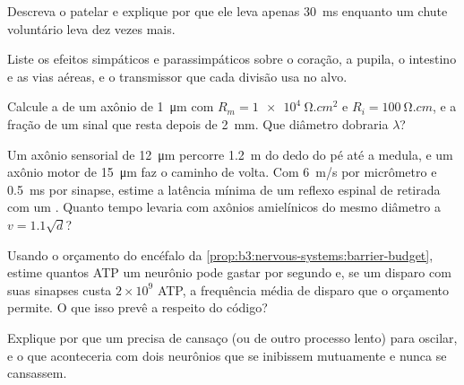 \begin{exercise}[$\star$]\label{exo:b3:nervous-systems:3}
Descreva o  patelar e explique por que ele leva apenas
\qty{30}{ms} enquanto um chute voluntário leva dez vezes mais.
\end{exercise}

\begin{exercise}[$\star$]\label{exo:b3:nervous-systems:4}
Liste os efeitos simpáticos e parassimpáticos sobre o coração, a pupila,
o intestino e as vias aéreas, e o transmissor que cada divisão usa no
alvo.
\end{exercise}

\begin{exercise}[$\star\star$]\label{exo:b3:nervous-systems:5}
Calcule a  de um axônio de \qty{1}{\micro m} com
$R_{m}
= \qty{1e4}{\ohm.cm^2}$ e $R_{i} = \qty{100}{\ohm.cm}$, e a
fração de um sinal que resta depois de \qty{2}{mm}. Que diâmetro
dobraria $\lambda$?
\end{exercise}

\begin{exercise}[$\star\star$]\label{exo:b3:nervous-systems:6}
Um axônio sensorial de \qty{12}{\micro m} percorre \qty{1.2}{m} do dedo
do pé até a medula, e um axônio motor de \qty{15}{\micro m} faz o
caminho de volta. Com \qty{6}{m/s} por micrômetro e \qty{0.5}{ms} por
sinapse, estime a latência mínima de um reflexo espinal de retirada com
um . Quanto tempo levaria com axônios amielínicos do mesmo
diâmetro a $v = 1.1\sqrt{d}$?
\end{exercise}

\begin{exercise}[$\star\star$]\label{exo:b3:nervous-systems:7}
Usando o orçamento do encéfalo da
\cref{prop:b3:nervous-systems:barrier-budget}, estime quantos ATP um
neurônio pode gastar por segundo e, se um disparo com suas sinapses
custa $2\times 10^{9}$ ATP, a frequência média de disparo que o
orçamento permite. O que isso prevê a respeito do código?
\end{exercise}

\begin{exercise}[$\star\star$]\label{exo:b3:nervous-systems:8}
Explique por que um  precisa de cansaço (ou de
outro processo lento) para oscilar, e o que aconteceria com dois
neurônios que se inibissem mutuamente e nunca se cansassem.
\end{exercise}

